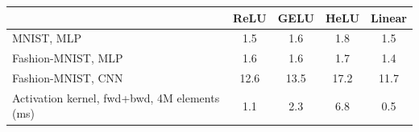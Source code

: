 \begin{tabular}{lcccc}
\toprule
 & ReLU & GELU & HeLU & Linear \\
\midrule
MNIST, MLP & 1.5 & 1.6 & 1.8 & 1.5 \\
Fashion-MNIST, MLP & 1.6 & 1.6 & 1.7 & 1.4 \\
Fashion-MNIST, CNN & 12.6 & 13.5 & 17.2 & 11.7 \\
\midrule Activation kernel, fwd+bwd, 4M elements (ms) & 1.1 & 2.3 & 6.8 & 0.5 \\
\bottomrule
\end{tabular}
